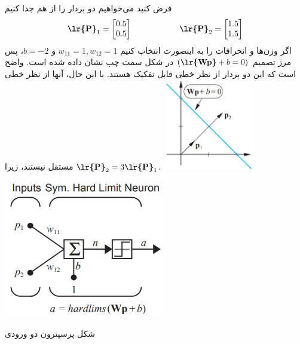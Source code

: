 \documentclass[a4paper,12pt]{report}
\begin{document}
  	     فرض کنید می‌خواهیم دو بردار را از هم جدا کنیم
  	     $$
  	     \textbf{\lr{P}}_1=
  	     \begin{bmatrix}
  	     	0.5 \\ 0.5
  	     \end{bmatrix}
       	 \hspace{2cm}
       	 \textbf{\lr{P}}_2=
       	 \begin{bmatrix}
       	 	1.5 \\ 1.5
       	 \end{bmatrix}
  	     $$
  	     اگر وزن‌ها و انحرافات را به اینصورت انتخاب کنیم
  	     $ w_{11}=1, w_{12}=1 $
  	     و
  	     $ b=-2 $،
  	      پس مرز تصمیم 
  	     $ (\textbf{\lr{Wp}}+b=0) $
  	       در شکل سمت چپ نشان داده شده است. واضح است که این دو بردار از نظر خطی قابل تفکیک هستند. با این حال، آنها از نظر خطی مستقل نیستند، زیرا   	         	       
  	       $ \textbf{\lr{P}}_2=3\textbf{\lr{P}}_1 $.
  	       \marginpar
  	       {
  	       		\includegraphics[width=4cm, height=4cm]{142-2}
  	       }
  	       \begin{center}
	  	       	\includegraphics[width=7cm, height=6cm]{142}
	  	       	
	  	       	شکل  پرسپترون دو ورودی
  	       \end{center}
         
\end{document}
